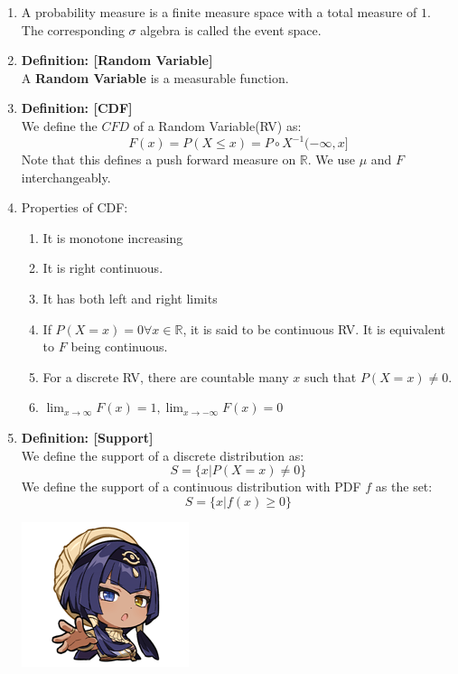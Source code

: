 \documentclass[12pt,oneside]{book}
\begin{document}
\begin{enumerate}
    \item A probability measure is a finite measure space with a total measure of $1$. The corresponding $\sigma$ algebra is called the event space. 
    \item \textbf{Definition: [Random Variable]}\\
    A \textbf{Random Variable} is a measurable function.
    \item \textbf{Definition: [CDF]}\\
    We define the $CFD$ of a Random Variable(RV) as:
    $$F(x)=P(X\leq x)=P\circ X^{-1}(-\infty,x]$$
    Note that this defines a push forward measure on $\mathbb R$. We use $\mu$ and $F$ interchangeably.
    \item Properties of CDF:
    \begin{enumerate}
        \item It is monotone increasing
        \item It is right continuous. 
        \item It has both left and right limits
        \item If $P(X=x)=0\forall x\in\mathbb R$, it is said to be continuous RV. It is equivalent to $F$ being continuous. 
        \item For a discrete RV, there are countable many $x$ such that $P(X=x)\ne0$.
        \item $\lim_{x\to\infty}F(x)=1,\lim_{x\to-\infty}F(x)=0$ 
    \end{enumerate}
    \item \textbf{Definition: [Support]}\\ We define the support of a discrete distribution as:
    $$S=\{x|P(X=x)\ne 0\}$$
    We define the support of a continuous distribution with PDF $f$ as the set:
    $$S=\{x|f(x)\geq0\}$$
    \begin{marginfigure}%
        \includegraphics[width=2.4\marginparwidth]{graphics/(41).png}
    \end{marginfigure}

\end{enumerate}
\end{document}
